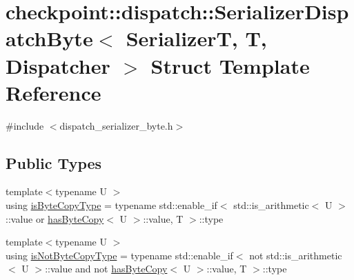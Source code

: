 \hypertarget{structcheckpoint_1_1dispatch_1_1_serializer_dispatch_byte}{}\section{checkpoint\+:\+:dispatch\+:\+:Serializer\+Dispatch\+Byte$<$ SerializerT, T, Dispatcher $>$ Struct Template Reference}
\label{structcheckpoint_1_1dispatch_1_1_serializer_dispatch_byte}


{\ttfamily \#include $<$dispatch\+\_\+serializer\+\_\+byte.\+h$>$}

\subsection*{Public Types}
\begin{DoxyCompactItemize}
\item 
{\footnotesize template$<$typename U $>$ }\\using \hyperlink{structcheckpoint_1_1dispatch_1_1_serializer_dispatch_byte_a7fd331c3b3693e8e69ae5cf7f5aeab93}{is\+Byte\+Copy\+Type} = typename std\+::enable\+\_\+if$<$ std\+::is\+\_\+arithmetic$<$ U $>$\+::value or \hyperlink{structcheckpoint_1_1dispatch_1_1has_byte_copy}{has\+Byte\+Copy}$<$ U $>$\+::value, T $>$\+::type
\item 
{\footnotesize template$<$typename U $>$ }\\using \hyperlink{structcheckpoint_1_1dispatch_1_1_serializer_dispatch_byte_af7214bae56db9cc342bc01fc61a8f403}{is\+Not\+Byte\+Copy\+Type} = typename std\+::enable\+\_\+if$<$ not std\+::is\+\_\+arithmetic$<$ U $>$\+::value and not \hyperlink{structcheckpoint_1_1dispatch_1_1has_byte_copy}{has\+Byte\+Copy}$<$ U $>$\+::value, T $>$\+::type
\end{DoxyCompactItemize}
